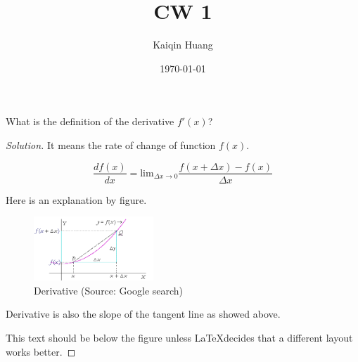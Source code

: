 \documentclass[aps,pra,notitlepage,amsmath,amssymb,letterpaper,12pt]{revtex4-1}
\newenvironment{problem}[2][Problem]{\begin{trivlist}
\item[\hskip \labelsep {\bfseries #1}\hskip \labelsep {\bfseries #2.}]}{\end{trivlist}}
\newenvironment{solution}{\begin{proof}[Solution]}{\end{proof}}
\begin{document}
\title{CW 1}
\author{Kaiqin Huang}
\date{\today}

\maketitle




\begin{problem}{Derivative}
What is the definition of the derivative $f'(x)$?
\end{problem}

\begin{solution}
It means the rate of change of function $f(x)$.

\begin{equation}
\frac{df(x)}{dx} = \text{lim}_{\Delta{x}\rightarrow0}\frac{f(x+\Delta{x})-f(x)}{\Delta{x}} \nonumber
\end{equation}




Here is an explanation by figure.

\begin{figure}[h!] %
  \includegraphics[width=0.4\textwidth]{007b.png}  %
  \caption{Derivative (Source: Google search)}
\end{figure}




Derivative is also the slope of the tangent line as showed above.

This text should be below the figure unless \LaTeX decides that a different layout works better.
\end{solution}
 
 
 
\end{document}
